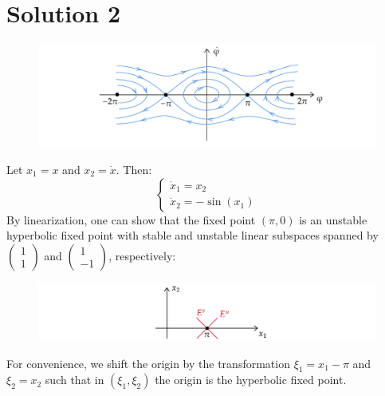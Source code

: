 \documentclass[twoside,10pt,a4paper]{article}
\begin{document}
\section*{Solution 2}
\begin{figure}[H]
	\centering
	\includegraphics[scale=0.9]{Graphics/S02D01.pdf}
\end{figure}
Let $x_1 = x$ and $x_2 = \dot{x}$. Then:
\begin{equation*}
	\begin{cases}
		\dot{x}_1 = x_2 \\
		\dot{x}_2 = -\sin(x_1)
	\end{cases}
\end{equation*}
By linearization, one can show that the fixed point $(\pi, 0)$ is an unstable hyperbolic fixed point with stable and unstable linear subspaces spanned by $\begin{pmatrix} 1 \\ 1 \end{pmatrix}$ and $\begin{pmatrix} 1 \\ -1 \end{pmatrix}$, respectively:
\begin{figure}[H]
	\centering
	\includegraphics[scale=0.9]{Graphics/S02D02.pdf}
\end{figure}
For convenience, we shift the origin by the transformation $\xi_1 = x_1 - \pi$ and $\xi_2 = x_2$ such that in $(\xi_1 , \xi_2)$ the origin is the hyperbolic fixed point.
\end{document}
